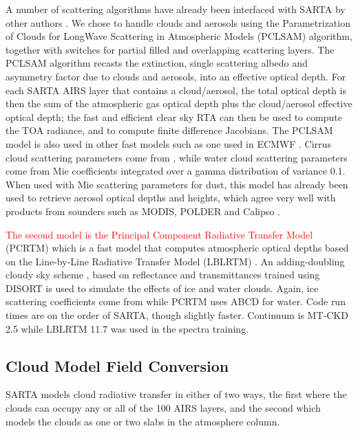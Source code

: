 \documentclass[agupp]{aguplus}              %
\begin{document}
\begin{article}
A number of scattering algorithms have already been interfaced with
SARTA by other authors \cite{niu:07}. We chose to handle clouds and
aerosols using the Parametrization of Clouds for LongWave Scattering
in Atmospheric Models (PCLSAM) \cite{cho:99} algorithm, together with
switches for partial filled and overlapping scattering layers. The
PCLSAM algorithm recasts the extinction, single scattering albedo and
asymmetry factor due to clouds and aerosols, into an effective optical
depth. For each SARTA AIRS layer that contains a cloud/aerosol, the
total optical depth is then the sum of the atmospheric gas optical
depth plus the cloud/aerosol effective optical depth; the fast and
efficient clear sky RTA can then be used to compute the TOA radiance,
and to compute finite difference Jacobians. The PCLSAM model is also
used in other fast models such as one used in ECMWF
\cite{mat:05}. Cirrus cloud scattering parameters come from
\citep{bau:07,bau:11}, while water cloud scattering parameters come
from Mie coefficients integrated over a gamma distribution of variance
0.1. When used with Mie scattering parameters for dust, this model has
already been used to retrieve aerosol optical depths and heights,
which agree very well with products from sounders such as MODIS,
POLDER and Calipso \citep{mac:10}.

\textcolor{red}{The second model is the Principal Component Radiative
Transfer Model} (PCRTM) which is a fast model that computes
atmospheric optical depths based on the Line-by-Line Radiative
Transfer Model (LBLRTM) \citep{liu:06}. An adding-doubling cloudy sky
scheme \citep{liu:09}, based on reflectance and transmittances trained
using DISORT \cite{stam:88} is used to simulate the effects of ice and
water clouds. Again, ice scattering coefficients come from
\citep{bau:11} while PCRTM uses ABCD for water. Code run times are on
the order of SARTA, though slightly faster. Continuum
is MT-CKD 2.5 while LBLRTM 11.7 was used in the spectra training.

\subsection{Cloud Model Field Conversion} 

SARTA models cloud radiative transfer in either of two ways, the first
where the clouds can occupy any or all of the 100 AIRS layers, and the
second which models the clouds as one or two slabs in the atmosphere
column. 


\end{article}
\end{document}
